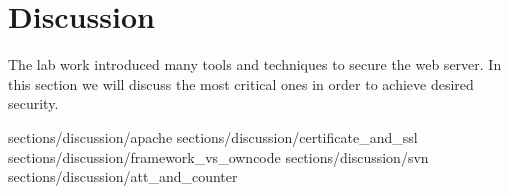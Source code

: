 \section {Discussion}

The lab work introduced many tools and techniques to secure the web server. In this section we will discuss the most critical ones in order to achieve desired security. 


 {sections/discussion/apache}
 {sections/discussion/certificate_and_ssl}
 {sections/discussion/framework_vs_owncode} %
 {sections/discussion/svn} %
 {sections/discussion/att_and_counter} %

